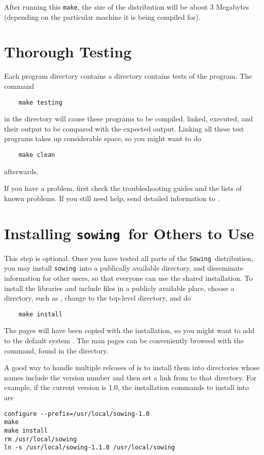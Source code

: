 \documentclass[11pt,twoside]{article}
\newcommand{\sowing}{{\tt sowing}}
\newcommand{\Sowing}{{\tt Sowing}}
\begin{document}
After running this {\tt make}, the size of the distribution will be about 3
Megabytes (depending on the particular machine it is being compiled for). 

\section{Thorough Testing}
\label{sec:thorough}
\label{sec-tests}

Each program directory contains a  directory contains tests of
the program.
The command
\begin{verbatim}
    make testing
\end{verbatim}
in the  directory will cause these programs to be
compiled, linked, executed, and their output to be compared with the expected
output.  Linking all these test programs takes up considerable space, so you
might want to do 
\begin{verbatim}
    make clean
\end{verbatim}
afterwards.  

If you have a problem, first check the troubleshooting guides and the lists of
known problems.  If you still need help, send detailed information to
. 

\section{Installing \texorpdfstring{\sowing\ }{sowing }for Others to Use}
\label{sec:installing}
This step is optional.  
Once you have tested all parts of the \Sowing\ distribution, you may install
\sowing\ into 
a publically available directory, and disseminate information for other users,
so that everyone can use the shared installation.
To install the libraries and include files in a
publicly available place, choose a directory, such as ,
change to the top-level  directory, and do
\begin{verbatim}
    make install
\end{verbatim}
The  pages will have been copied with the installation, so you might
want to add  to the default system .
The man pages can be conveniently browsed with the  command,
found in the  directory.

A good way to handle multiple releases of  is to install
them into directories whose names include the version number and then
set a link from  to that directory.  For example, if the
current version is 1.0, the installation commands to install into
 are 
\begin{verbatim}
configure --prefix=/usr/local/sowing-1.0
make
make install 
rm /usr/local/sowing
ln -s /usr/local/sowing-1.1.0 /usr/local/sowing
\end{verbatim}
\end{document}
